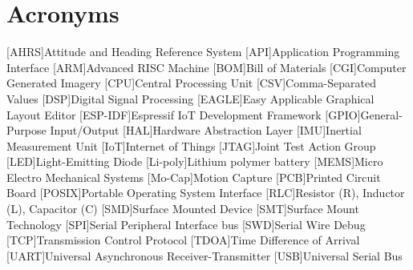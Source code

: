 \chapter{Acronyms}

\begin{acronym}

[AHRS]{Attitude and Heading Reference System}
[API]{Application Programming Interface}
[ARM]{Advanced RISC Machine}
[BOM]{Bill of Materials}
[CGI]{Computer Generated Imagery}
[CPU]{Central Processing Unit}
[CSV]{Comma-Separated Values}
[DSP]{Digital Signal Processing}
[EAGLE]{Easy Applicable Graphical Layout Editor}
[ESP-IDF]{Espressif IoT Development Framework}
[GPIO]{General-Purpose Input/Output}
[HAL]{Hardware Abstraction Layer}
[IMU]{Inertial Measurement Unit}
[IoT]{Internet of Things}
[JTAG]{Joint Test Action Group}
[LED]{Light-Emitting Diode}
[Li-poly]{Lithium polymer battery}
[MEMS]{Micro Electro Mechanical Systems}
[Mo-Cap]{Motion Capture}
[PCB]{Printed Circuit Board}
[POSIX]{Portable Operating System Interface}
[RLC]{Resistor (R), Inductor (L), Capacitor (C)}
[SMD]{Surface Mounted Device}
[SMT]{Surface Mount Technology}
[SPI]{Serial Peripheral Interface bus}
[SWD]{Serial Wire Debug}
[TCP]{Transmission Control Protocol}
[TDOA]{Time Difference of Arrival}
[UART]{Universal Asynchronous Receiver-Transmitter}
[USB]{Universal Serial Bus}

\end{acronym}
